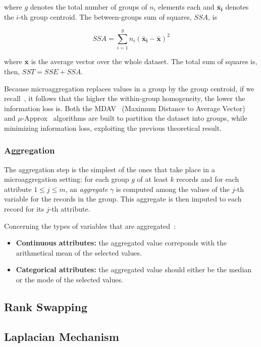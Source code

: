 where $g$ denotes the total number of groups of $n_i$ elements each and $\mathbf{\bar{x}_i}$ denotes the $i$-th group centroid. The between-groups sum of squares, $SSA$, is

\begin{equation}
SSA = \sum_{i=1}^{g} n_i (\mathbf{\bar{x}_i} - \mathbf{\bar{x}})^2
\end{equation}

where $\mathbf{\bar{x}}$ is the average vector over the whole dataset. The total sum of squares is, then, $SST = SSE + SSA$.

Because microaggregation replaces values in a group by the group centroid, if we recall~, it follows that the higher the within-group homogeneity, the lower the information loss is. Both the MDAV~\citep{Domingo:KAnonMicroagg} (Maximum Distance to Average Vector) and $\mu$-Approx~\citep{Domingo:MuAproxPolyTimeMicroagg} algorithms are built to partition the dataset into groups, while minimizing information loss, exploiting the previous theoretical result.

\subsubsection{Aggregation}

The aggregation step is the simplest of the ones that take place in a microaggregation setting: for each group $g$ of at least $k$ records and for each attribute $1 \leq j \leq m$, an \textit{aggregate} $\gamma$ is computed among the values of the $j$-th variable for the records in the group. This aggregate is then imputed to each record for its $j$-th attribute.

Concerning the types of variables that are aggregated~\citep{Domingo:KAnonMicroagg}:

\begin{itemize}
	\item
	\textbf{Continuous attributes:} the aggregated value correponds with the arithmetical mean of the selected values.
	\item
	\textbf{Categorical attributes:} the aggregated value should either be the median or the mode of the selected values.
\end{itemize}

\subsection{Rank Swapping}
\label{Theory:SDCMethods:RankSwapping}


\subsection{Laplacian Mechanism}
\label{Theory:SDCMethods:LaplacianMechanism}

